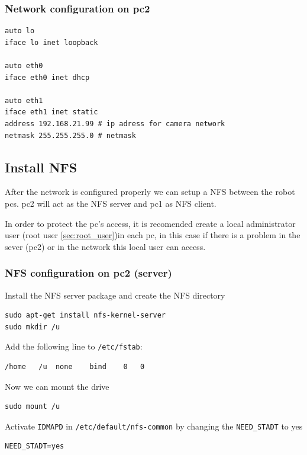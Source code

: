 \subsubsection{Network configuration on pc2}

\begin{lstlisting} 
auto lo
iface lo inet loopback

auto eth0
iface eth0 inet dhcp

auto eth1
iface eth1 inet static
address 192.168.21.99 # ip adress for camera network
netmask 255.255.255.0 # netmask
\end{lstlisting}

\subsection{Install NFS}
After the network is configured properly we can setup a NFS between the robot pcs. pc2 will act as the NFS server and pc1 as NFS client.

In order to protect the pc's access, it is recomended create a local administrator user (root user \ref{sec:root_user})in each pc, in this case if there is a problem in the sever (pc2) or in the network this local user can access.

\subsubsection{NFS configuration on pc2 (server)}
Install the NFS server package and create the NFS directory

\begin{lstlisting}
sudo apt-get install nfs-kernel-server
sudo mkdir /u 
\end{lstlisting}

Add the following line to \texttt{/etc/fstab}:

\begin{lstlisting}
/home	/u	none	bind	0	0
\end{lstlisting}

Now we can mount the drive

\begin{lstlisting}
sudo mount /u
\end{lstlisting}

Activate \texttt{IDMAPD} in \texttt{/etc/default/nfs-common} by changing the \texttt{NEED\_STADT} to yes

\begin{lstlisting}
NEED_STADT=yes
\end{lstlisting}


